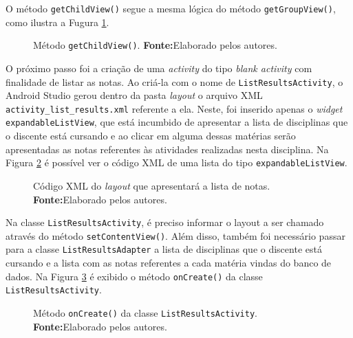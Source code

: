 	\pagebreak

	\par O método \texttt{getChildView()} segue a mesma lógica do método
\texttt{getGroupView()}, como ilustra a Fugura \ref{fig:app14}.

	\begin{figure}[h!] 
		
		\caption[Método getChildView()]{Método \texttt{getChildView()}.
		\textbf{Fonte:}Elaborado pelos autores.}
		\label{fig:app14}
	\end{figure}
	
	\par O próximo passo foi a criação de uma \textit{activity} do tipo
\textit{blank activity} com finalidade de listar as notas. Ao criá-la com o
nome de \texttt{ListResultsActivity}, o Android Studio gerou dentro da pasta
\textit{layout} o arquivo XML \texttt{activity\_list\_results.xml} referente a
ela. Neste, foi inserido apenas o \textit{widget} \texttt{expandableListView},
que está incumbido de apresentar a lista de disciplinas que o discente está
cursando e ao clicar em alguma dessas matérias serão apresentadas as notas
referentes às atividades realizadas nesta disciplina. Na Figura \ref{fig:app15}
é possível ver o código XML de uma lista do tipo \texttt{expandableListView}.

	\begin{figure}[h!] 
		
		\caption[Código XML do layout que apresentará a lista de notas]{Código XML do
		\textit{layout} que apresentará a lista de notas.
		\textbf{Fonte:}Elaborado pelos autores.}
		\label{fig:app15}
	\end{figure}
	
	\pagebreak
	
	\par Na classe \texttt{ListResultsActivity}, é preciso informar o layout a ser
chamado através do método \texttt{setContentView()}. Além disso, também foi
necessário passar para a classe \texttt{ListResultsAdapter} a lista de
disciplinas que o discente está cursando e a lista com as notas referentes a
cada matéria vindas do banco de dados. Na Figura \ref{fig:app16} é exibido o
método \texttt{onCreate()} da classe \texttt{ListResultsActivity}. 
	
	
	\begin{figure}[h!] 
		
		\caption[ Método onCreate() da classe ListResultsActivity]{ Método
		\texttt{onCreate()} da classe \texttt{ListResultsActivity}.
		\textbf{Fonte:}Elaborado pelos autores.}
		\label{fig:app16}
	\end{figure}

